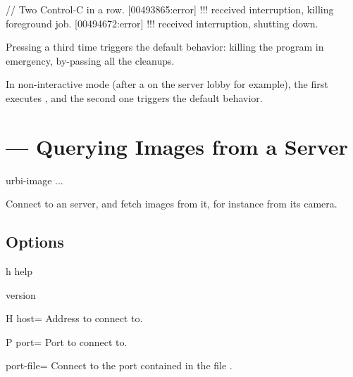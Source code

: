\begin{urbiunchecked}
// Two Control-C in a row.
[00493865:error] !!! received interruption, killing foreground job.
[00494672:error] !!! received interruption, shutting down.
\end{urbiunchecked}

Pressing  a third time triggers the default behavior: killing the
program in emergency, by-passing all the cleanups.

\medskip

In non-interactive mode (after a  on the server lobby
for example), the first  executes , and
the second one triggers the default behavior.


\section{ --- Querying Images from a Server}
\label{sec:tools:urbi-image}

\begin{shell}
urbi-image ...
\end{shell}

Connect to an \urbi server, and fetch images from it, for instance
from its camera.

\subsection{Options}

\begin{options}
\item[h]{help} \optionHelp
\item{version} \optionVersion
\end{options}

\begin{options}[Networking]
\item[H]{host=} Address to connect to.
\item[P]{port=} Port to connect to.
\item{port-file=} Connect to the port contained in the file
  .
\end{options}

